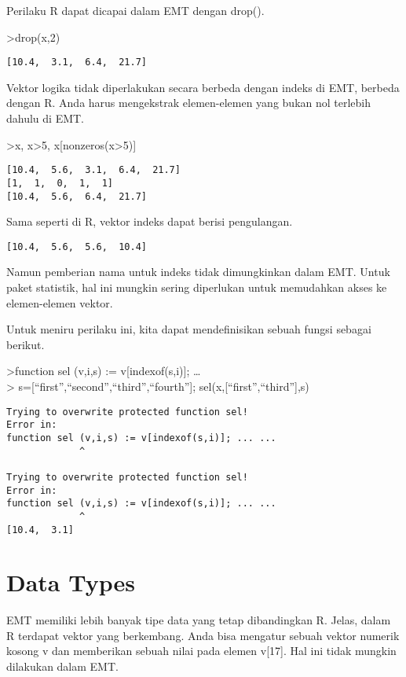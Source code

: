 \documentclass[
]{book}
\begin{document}
Perilaku R dapat dicapai dalam EMT dengan drop().

\textgreater drop(x,2)

\begin{verbatim}
[10.4,  3.1,  6.4,  21.7]
\end{verbatim}

Vektor logika tidak diperlakukan secara berbeda dengan indeks di EMT, berbeda dengan R. Anda harus mengekstrak elemen-elemen yang bukan nol terlebih dahulu di EMT.

\textgreater x, x\textgreater5, x{[}nonzeros(x\textgreater5){]}

\begin{verbatim}
[10.4,  5.6,  3.1,  6.4,  21.7]
[1,  1,  0,  1,  1]
[10.4,  5.6,  6.4,  21.7]
\end{verbatim}

Sama seperti di R, vektor indeks dapat berisi pengulangan.

\begin{verbatim}
[10.4,  5.6,  5.6,  10.4]
\end{verbatim}

Namun pemberian nama untuk indeks tidak dimungkinkan dalam EMT. Untuk paket statistik, hal ini mungkin sering diperlukan untuk memudahkan akses ke elemen-elemen vektor.

Untuk meniru perilaku ini, kita dapat mendefinisikan sebuah fungsi sebagai berikut.

\textgreater function sel (v,i,s) := v{[}indexof(s,i){]}; \ldots{}\\
\textgreater{} s={[}``first'',``second'',``third'',``fourth''{]}; sel(x,{[}``first'',``third''{]},s)

\begin{verbatim}
Trying to overwrite protected function sel!
Error in:
function sel (v,i,s) := v[indexof(s,i)]; ... ...
             ^

Trying to overwrite protected function sel!
Error in:
function sel (v,i,s) := v[indexof(s,i)]; ... ...
             ^
[10.4,  3.1]
\end{verbatim}

\section{Data Types}\label{data-types}

EMT memiliki lebih banyak tipe data yang tetap dibandingkan R. Jelas, dalam R terdapat vektor yang berkembang. Anda bisa mengatur sebuah vektor numerik kosong v dan memberikan sebuah nilai pada elemen v{[}17{]}. Hal ini tidak mungkin dilakukan dalam EMT.
\end{document}
